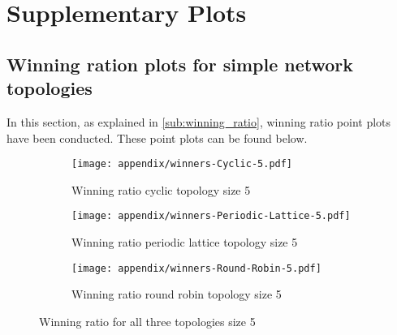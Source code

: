 \begin{table}[H]
\caption{List of Axelrod-Python strategies part 3}
\end{table}

\section{Supplementary Plots}
\subsection{Winning ration plots for simple network topologies}
\label{append:wining-ratio-further-plot}
In this section, as explained in \autoref{sub:winning_ratio}, winning ratio point plots
have been conducted. These point plots can be found below.
\begin{figure}[H]
	\centering
	\begin{subfigure}[t]{0.65\textwidth}
		\centering
		\texttt{[image: appendix/winners-Cyclic-5.pdf]}
		\caption{Winning ratio cyclic topology size 5}
	\end{subfigure}
	\hfill
	\begin{subfigure}[t]{0.65\textwidth}\centering
		\centering
		\texttt{[image: appendix/winners-Periodic-Lattice-5.pdf]}
		\caption{Winning ratio periodic lattice topology size 5}
	\end{subfigure}
	\hfill
	\begin{subfigure}[t]{0.65\textwidth}\centering
		\centering
		\texttt{[image: appendix/winners-Round-Robin-5.pdf]}
		\caption{Winning ratio round robin topology size 5}
	\end{subfigure}
	\caption{Winning ratio for all three topologies size 5}
	\label{fig:winning-five}

\end{figure}

